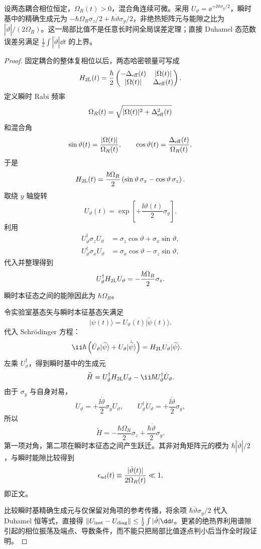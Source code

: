 \begin{proposition}[二态瞬时本征基的连接项]
设两态耦合相位恒定，$\Omega_R(t)>0$，混合角连续可微。采用 $U_\vartheta=\ee^{+\ii\vartheta\sigma_y/2}$，瞬时基中的精确生成元为 $-\hbar\Omega_R\sigma_z/2+\hbar\dot\vartheta\sigma_y/2$，非绝热矩阵元与能隙之比为 $|\dot\vartheta|/(2\Omega_R)$。这一局部比值不是任意长时间全局误差定理；直接 Duhamel 态范数误差另满足 $\frac12\int|\dot\vartheta|\dd t$ 的上界。
\end{proposition}
\begin{proof}
固定耦合的整体复相位以后，两态哈密顿量可写成
\[
H_{2\rm L}(t)
=\frac{\hbar}{2}
\begin{pmatrix}
-\Delta_{\rm eff}(t)&|\Omega(t)|\\
|\Omega(t)|&\Delta_{\rm eff}(t)
\end{pmatrix}.
\]
定义瞬时 Rabi 频率
\[
\Omega_R(t)=\sqrt{|\Omega(t)|^2+\Delta_{\rm eff}^2(t)}
\]
和混合角
\[
\sin\vartheta(t)=\frac{|\Omega(t)|}{\Omega_R(t)},
\qquad
\cos\vartheta(t)=\frac{\Delta_{\rm eff}(t)}{\Omega_R(t)}.
\]
于是
\[
H_{2\rm L}(t)
=\frac{\hbar\Omega_R}{2}
\left(\sin\vartheta\,\sigma_x-\cos\vartheta\,\sigma_z\right).
\]
取绕 $y$ 轴旋转
\[
U_\vartheta(t)=\exp\!\left[+\frac{\ii\vartheta(t)}2\sigma_y\right].
\]
利用
\begin{align*}
U_\vartheta^\dagger\sigma_zU_\vartheta
&=\sigma_z\cos\vartheta+\sigma_x\sin\vartheta,\\
U_\vartheta^\dagger\sigma_xU_\vartheta
&=\sigma_x\cos\vartheta-\sigma_z\sin\vartheta,
\end{align*}
代入并整理得到
\[
U_\vartheta^\dagger H_{2\rm L}U_\vartheta
=-\frac{\hbar\Omega_R}{2}\sigma_z.
\]
瞬时本征态之间的能隙因此为 $\hbar\Omega_R$。

令实验室基态矢与瞬时本征基态矢满足
\[
|\psi(t)\rangle=U_\vartheta(t)|\widetilde\psi(t)\rangle.
\]
代入 Schr\"odinger 方程：
\begin{align*}
\ii\hbar\left(\dot U_\vartheta|\widetilde\psi\rangle
+U_\vartheta|\dot{\widetilde\psi}\rangle\right)
&=H_{2\rm L}U_\vartheta|\widetilde\psi\rangle.
\end{align*}
左乘 $U_\vartheta^\dagger$，得到瞬时基中的生成元
\[
\widetilde H
=U_\vartheta^\dagger H_{2\rm L}U_\vartheta
-\ii\hbar U_\vartheta^\dagger\dot U_\vartheta.
\]
由于 $\sigma_y$ 与自身对易，
\[
\dot U_\vartheta
=+\frac{\ii\dot\vartheta}{2}\sigma_yU_\vartheta,
\qquad
U_\vartheta^\dagger\dot U_\vartheta
=+\frac{\ii\dot\vartheta}{2}\sigma_y,
\]
所以
\[
\widetilde H
=-\frac{\hbar\Omega_R}{2}\sigma_z
+\frac{\hbar\dot\vartheta}{2}\sigma_y.
\]
第一项对角，第二项在瞬时本征态之间产生跃迁。其非对角矩阵元的模为
$\hbar|\dot\vartheta|/2$，与瞬时能隙比较得到
\[
\epsilon_{\rm ad}(t)
\equiv\frac{|\dot\vartheta(t)|}{2\Omega_R(t)}\ll1,
\]
即正文。

比较瞬时基精确生成元与仅保留对角项的参考传播，将余项 $\hbar\dot\vartheta\sigma_y/2$ 代入 Duhamel 恒等式，直接得 $\|U_{\rm inst}-U_{\rm diag}\|\le\frac12\int|\dot\vartheta|\dd t$。更紧的绝热界利用谱隙引起的相位振荡及端点、导数条件，而不能只把局部比值逐点判小后当作全时段证明。
\end{proof}


